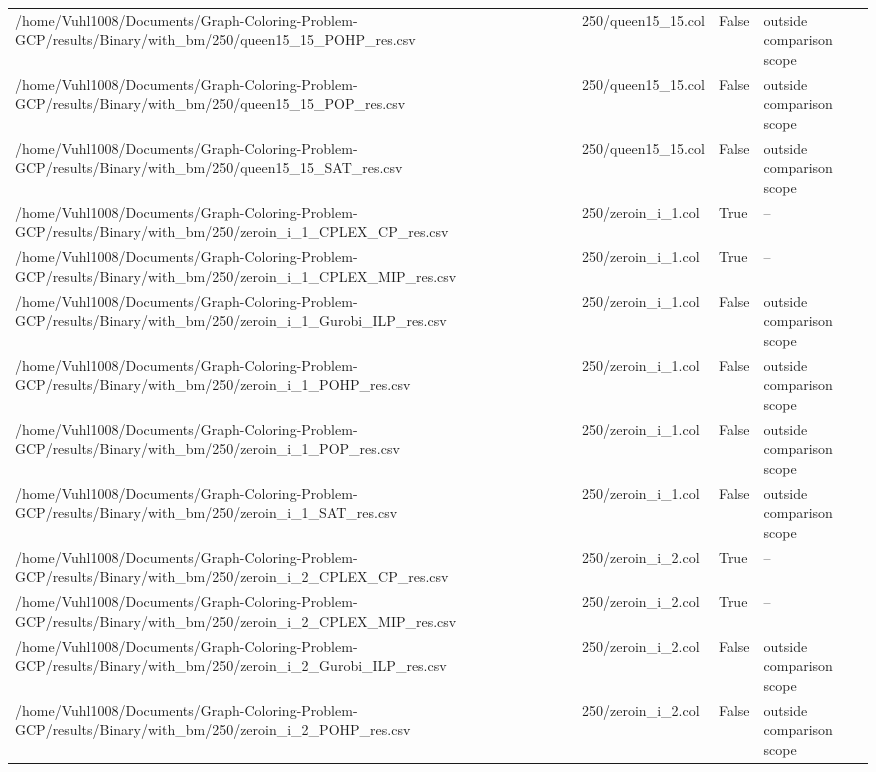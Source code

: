 \begin{table}[htbp]
\begin{tabular}{llll}
/home/Vuhl1008/Documents/Graph-Coloring-Problem-GCP/results/Binary/with\_bm/250/queen15\_15\_POHP\_res.csv & 250/queen15\_15.col & False & outside comparison scope \\
/home/Vuhl1008/Documents/Graph-Coloring-Problem-GCP/results/Binary/with\_bm/250/queen15\_15\_POP\_res.csv & 250/queen15\_15.col & False & outside comparison scope \\
/home/Vuhl1008/Documents/Graph-Coloring-Problem-GCP/results/Binary/with\_bm/250/queen15\_15\_SAT\_res.csv & 250/queen15\_15.col & False & outside comparison scope \\
/home/Vuhl1008/Documents/Graph-Coloring-Problem-GCP/results/Binary/with\_bm/250/zeroin\_i\_1\_CPLEX\_CP\_res.csv & 250/zeroin\_i\_1.col & True & -- \\
/home/Vuhl1008/Documents/Graph-Coloring-Problem-GCP/results/Binary/with\_bm/250/zeroin\_i\_1\_CPLEX\_MIP\_res.csv & 250/zeroin\_i\_1.col & True & -- \\
/home/Vuhl1008/Documents/Graph-Coloring-Problem-GCP/results/Binary/with\_bm/250/zeroin\_i\_1\_Gurobi\_ILP\_res.csv & 250/zeroin\_i\_1.col & False & outside comparison scope \\
/home/Vuhl1008/Documents/Graph-Coloring-Problem-GCP/results/Binary/with\_bm/250/zeroin\_i\_1\_POHP\_res.csv & 250/zeroin\_i\_1.col & False & outside comparison scope \\
/home/Vuhl1008/Documents/Graph-Coloring-Problem-GCP/results/Binary/with\_bm/250/zeroin\_i\_1\_POP\_res.csv & 250/zeroin\_i\_1.col & False & outside comparison scope \\
/home/Vuhl1008/Documents/Graph-Coloring-Problem-GCP/results/Binary/with\_bm/250/zeroin\_i\_1\_SAT\_res.csv & 250/zeroin\_i\_1.col & False & outside comparison scope \\
/home/Vuhl1008/Documents/Graph-Coloring-Problem-GCP/results/Binary/with\_bm/250/zeroin\_i\_2\_CPLEX\_CP\_res.csv & 250/zeroin\_i\_2.col & True & -- \\
/home/Vuhl1008/Documents/Graph-Coloring-Problem-GCP/results/Binary/with\_bm/250/zeroin\_i\_2\_CPLEX\_MIP\_res.csv & 250/zeroin\_i\_2.col & True & -- \\
/home/Vuhl1008/Documents/Graph-Coloring-Problem-GCP/results/Binary/with\_bm/250/zeroin\_i\_2\_Gurobi\_ILP\_res.csv & 250/zeroin\_i\_2.col & False & outside comparison scope \\
/home/Vuhl1008/Documents/Graph-Coloring-Problem-GCP/results/Binary/with\_bm/250/zeroin\_i\_2\_POHP\_res.csv & 250/zeroin\_i\_2.col & False & outside comparison scope \\

\end{tabular}
\end{table}
